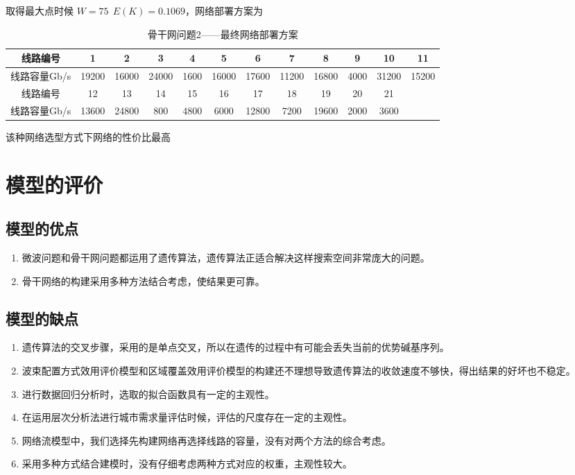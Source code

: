 \documentclass[UTF8,12pt]{ctexart}
\begin{document}
        取得最大点时候 $W=75~~E(K)=0.1069$，网络部署方案为
      \begin{table}[htbp]
        \centering
        \caption{骨干网问题2——最终网络部署方案}
        \begin{scriptsize}
          \begin{tabular}{cccccccccccc}
          \toprule
          线路编号   & 1      & 2      & 3      & 4      & 5      & 6      & 7      & 8      & 9      & 10     & 11 \\
          \midrule
          线路容量Gb/s & 19200  & 16000  & 24000  & 1600   & 16000  & 17600  & 11200  & 16800  & 4000   & 31200  & 15200 \\
          \midrule
          线路编号   & 12     & 13     & 14     & 15     & 16     & 17     & 18     & 19     & 20     & 21     &  \\
          \midrule
          线路容量Gb/s & 13600  & 24800  & 800    & 4800   & 6000   & 12800  & 7200   & 19600  & 2000   & 3600   &  \\
          \bottomrule
          \end{tabular}%
        \end{scriptsize}
      \end{table}%

        该种网络选型方式下网络的性价比最高
\newpage
\section{模型的评价}
    \subsection{模型的优点}
        \begin{enumerate}
            \item 微波问题和骨干网问题都运用了遗传算法，遗传算法正适合解决这样搜索空间非常庞大的问题。
            \item 骨干网络的构建采用多种方法结合考虑，使结果更可靠。
        \end{enumerate}
    \subsection{模型的缺点}
        \begin{enumerate}
            \item 遗传算法的交叉步骤，采用的是单点交叉，所以在遗传的过程中有可能会丢失当前的优势碱基序列。
            \item 波束配置方式效用评价模型和区域覆盖效用评价模型的构建还不理想导致遗传算法的收敛速度不够快，得出结果的好坏也不稳定。
            \item 进行数据回归分析时，选取的拟合函数具有一定的主观性。
            \item 在运用层次分析法进行城市需求量评估时候，评估的尺度存在一定的主观性。
            \item 网络流模型中，我们选择先构建网络再选择线路的容量，没有对两个方法的综合考虑。
            \item 采用多种方式结合建模时，没有仔细考虑两种方式对应的权重，主观性较大。
        \end{enumerate}
\end{document}
